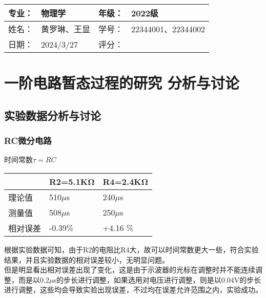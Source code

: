 \documentclass[dvipsnames, svgnames,a4paper,11pt]{article}
\begin{document}
	
	
	\clearpage
	
	\begin{table}
		\renewcommand\arraystretch{1.7}
		\begin{tabularx}{\textwidth}{|X|X|X|X|}
			\hline
			专业：& 物理学 &年级：& 2022级\\
			\hline
			姓名： & 黄罗琳、王显 & 学号：& 22344001、22344002\\
			\hline
			日期：& 2024/3/27 & 评分： &\\
			\hline
		\end{tabularx}
	\end{table}
	
	\section { 一阶电路暂态过程的研究 \quad \heiti 分析与讨论}
	
	\subsection{实验数据分析与讨论}
	
	\subsubsection{RC微分电路}
	时间常数$\tau=RC$
	\begin{table}[H]
		\centering
		\begin{tabular}{|l|l|l|}
		\hline
			~ & R2=5.1KΩ & R4=2.4KΩ \\ \hline
			理论值 & 510$\mu$s & 240$\mu$s \\ \hline
			测量值 & 508$\mu$s & 250$\mu$s \\ \hline
			相对误差 & -0.39\% & +4.16 \% \\ \hline
		\end{tabular}
	\end{table}
	根据实验数据可知，由于R2的电阻比R4大，故可以时间常数更大一些，符合实验结果，并且实验数据的相对误差较小，无明显问题。\\
	\indent 但是明显看出相对误差出现了变化，这是由于示波器的光标在调整时并不能连续调整，而是以0.2$\mu$s的步长进行调整，如果选用对电压进行调整，则是以0.04V的步长进行调整，这些均会导致实验出现误差，不过均在误差允许范围之内，实验成功。
	
\end{document}
